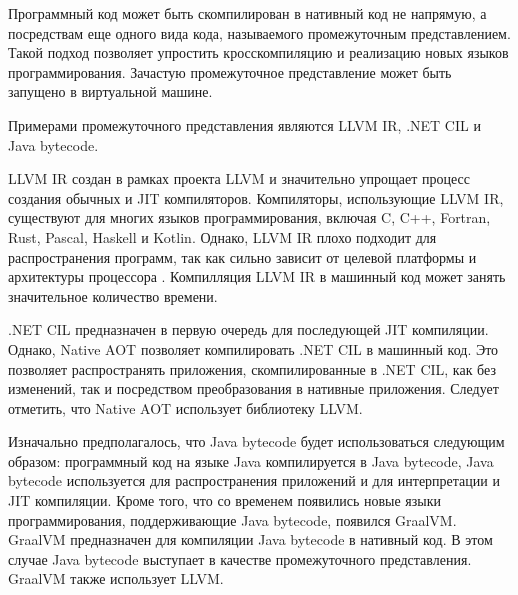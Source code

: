 Программный код может быть скомпилирован в нативный код не напрямую, а посредствам еще одного вида кода, называемого промежуточным представлением.
Такой подход позволяет упростить кросскомпиляцию и реализацию новых языков программирования. 
Зачастую промежуточное представление может быть запущено в виртуальной машине.

Примерами промежуточного представления являются LLVM IR, .NET CIL и Java bytecode.

LLVM IR создан в рамках проекта LLVM и значительно упрощает процесс создания обычных и JIT компиляторов. 
Компиляторы, использующие LLVM IR, существуют для многих языков программирования, включая C, C++, Fortran, Rust, Pascal, Haskell и Kotlin. 
Однако, LLVM IR плохо подходит для распространения программ, так как сильно зависит от целевой платформы и архитектуры процессора \cite{LLVMNotPortable}.
Компилляция LLVM IR в машинный код может занять значительное количество времени.

.NET CIL предназначен в первую очередь для последующей JIT компиляции. 
Однако, Native AOT позволяет компилировать .NET CIL в машинный код.
Это позволяет распространять приложения, скомпилированные в .NET CIL, как без изменений, так и посредством преобразования в нативные приложения.
Следует отметить, что Native AOT использует библиотеку LLVM.

Изначально предполагалось, что Java bytecode будет использоваться следующим образом: программный код на языке Java компилируется в Java bytecode, Java bytecode используется для распространения приложений и для интерпретации и JIT компиляции.
Кроме того, что со временем появились новые языки программирования, поддерживающие Java bytecode, появился GraalVM.
GraalVM предназначен для компиляции Java bytecode в нативный код.
В этом случае Java bytecode выступает в качестве промежуточного представления.
GraalVM также использует LLVM.
